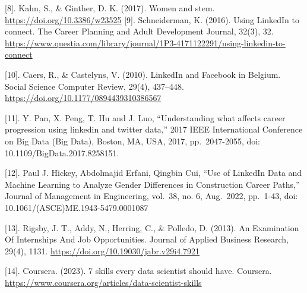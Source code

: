 \documentclass[11pt,]{article}
\begin{document}
{[}8{]}. Kahn, S., \& Ginther, D. K. (2017). Women and stem.
\url{https://doi.org/10.3386/w23525} {[}9{]}. Schneiderman, K. (2016).
Using LinkedIn to connect. The Career Planning and Adult Development
Journal, 32(3), 32.
\url{https://www.questia.com/library/journal/1P3-4171122291/using-linkedin-to-connect}

{[}10{]}. Caers, R., \& Castelyns, V. (2010). LinkedIn and Facebook in
Belgium. Social Science Computer Review, 29(4), 437--448.
\url{https://doi.org/10.1177/0894439310386567}

{[}11{]}. Y. Pan, X. Peng, T. Hu and J. Luo, ``Understanding what
affects career progression using linkedin and twitter data,'' 2017 IEEE
International Conference on Big Data (Big Data), Boston, MA, USA, 2017,
pp.~2047-2055, doi: 10.1109/BigData.2017.8258151.

{[}12{]}. Paul J. Hickey, Abdolmajid Erfani, Qingbin Cui, ``Use of
LinkedIn Data and Machine Learning to Analyze Gender Differences in
Construction Career Paths,'' Journal of Management in Engineering,
vol.~38, no. 6, Aug.~2022, pp.~1-43, doi:
10.1061/(ASCE)ME.1943-5479.0001087

{[}13{]}. Rigsby, J. T., Addy, N., Herring, C., \& Polledo, D. (2013).
An Examination Of Internships And Job Opportunities. Journal of Applied
Business Research, 29(4), 1131.
\url{https://doi.org/10.19030/jabr.v29i4.7921}

{[}14{]}. Coursera. (2023). 7 skills every data scientist should have.
Coursera. \url{https://www.coursera.org/articles/data-scientist-skills}





\newpage
\singlespacing
\end{document}
